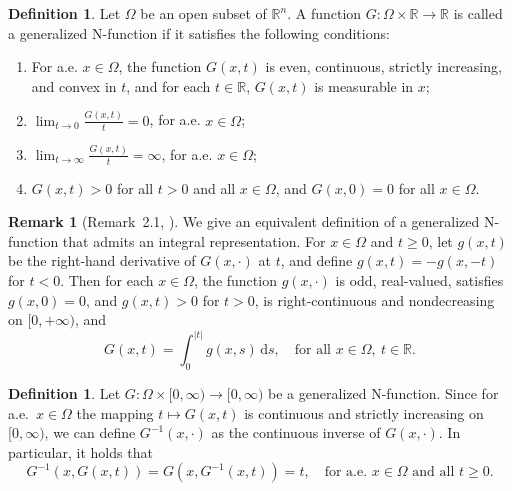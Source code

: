 \documentclass[10pt,reqno]{amsart}
\newcommand *\w{^\wedge}
\theoremstyle{definition}
\newtheorem{definition}[theorem]{Definition}
\newtheorem{remark}[theorem]{Remark}
\numberwithin{equation}{section}
\begin{document}
\begin{definition}
Let $\Omega$ be an open subset of $\mathbb{R}^n$. A function $G:\Omega \times \mathbb{R} \to \mathbb{R}$ is called a generalized \textnormal{N}-function if it satisfies the following conditions:
\begin{enumerate}
    \item[(1)] For a.e. $x\in \Omega$, the function $G(x,t)$ is even, continuous, strictly increasing, and convex in $t$, and for each $t\in \mathbb{R}$, $G(x,t)$ is measurable in $x$;
    \item[(2)] $\displaystyle\lim_{t \to 0} \frac{G(x,t)}{t} = 0$, for a.e. $x\in \Omega$;
    \item[(3)] $\displaystyle\lim_{t \to \infty} \frac{G(x,t)}{t} = \infty$, for a.e. $x\in \Omega$;
    \item[(4)] $G(x,t) > 0$ for all $t > 0$ and all $x\in \Omega$, and $G(x,0) = 0$ for all $x\in \Omega$.
\end{enumerate}
\end{definition}

\begin{remark}[Remark~2.1, \cite{Ala1}]
We give an equivalent definition of a generalized \textnormal{N}-function that admits an integral representation. For $x \in \Omega$ and $t \geq 0$, let $g(x,t)$ be the right-hand derivative of $G(x,\cdot)$ at $t$, and define $g(x,t) = -g(x,-t)$ for $t < 0$. Then for each $x \in \Omega$, the function $g(x,\cdot)$ is odd, real-valued, satisfies $g(x,0) = 0$, and $g(x,t) > 0$ for $t > 0$, is right-continuous and nondecreasing on $[0, +\infty)$, and
\[
G(x,t) = \int_0^{|t|} g(x,s)\, \mathrm{d}s, \quad \text{for all } x\in \Omega, \ t\in \mathbb{R}.
\]
\end{remark}
\begin{definition}\label{definv}
Let $G:\Omega\times[0,\infty)\to[0,\infty)$ be a generalized $\mathrm{N}$-function.
Since for a.e.\ $x\in\Omega$ the mapping $t\mapsto G(x,t)$ is continuous and
strictly increasing on $[0,\infty)$, we can define $G^{-1}(x,\cdot)$ as the
continuous inverse of $G(x,\cdot)$. In particular, it holds that
\[
G^{-1}(x,G(x,t)) = G(x,G^{-1}(x,t)) = t,
\quad \text{for a.e.\ } x\in\Omega \text{ and all } t\ge 0.
\]
\end{definition}
\end{document}
